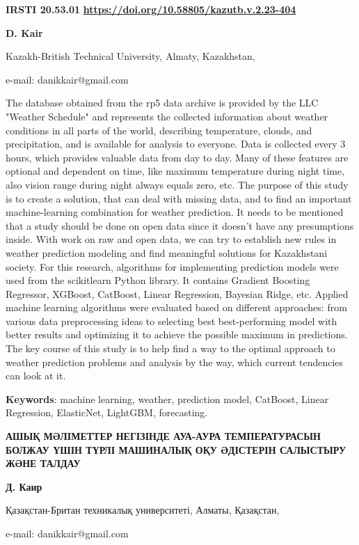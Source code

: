 \newpage
{\bfseries IRSTI 20.53.01}
\hfill {\bfseries \href{https://doi.org/10.58805/kazutb.v.2.23-404}{https://doi.org/10.58805/kazutb.v.2.23-404}}


\begin{center}
{\bfseries D. Kair}

Kazakh-British Technical University, Almaty, Kazakhstan,

e-mail: danikkair@gmail.com
\end{center}

The database obtained from the rp5 data archive is provided by the LLC
"Weather Schedule" and represents the collected information about
weather conditions in all parts of the world, describing temperature,
clouds, and precipitation, and is available for analysis to everyone.
Data is collected every 3 hours, which provides valuable data from day
to day. Many of these features are optional and dependent on time, like
maximum temperature during night time, also vision range during night
always equals zero, etc. The purpose of this study is to create a
solution, that can deal with missing data, and to find an important
machine-learning combination for weather prediction. It needs to be
mentioned that a study should be done on open data since it doesn't have
any presumptions inside. With work on raw and open data, we can try to
establish new rules in weather prediction modeling and find meaningful
solutions for Kazakhstani society. For this research, algorithms for
implementing prediction models were used from the scikitlearn Python
library. It contains Gradient Boosting Regressor, XGBoost, CatBoost,
Linear Regression, Bayesian Ridge, etc. Applied machine learning
algorithms were evaluated based on different approaches: from various
data preprocessing ideas to selecting best best-performing model with
better results and optimizing it to achieve the possible maximum in
predictions. The key course of this study is to help find a way to the
optimal approach to weather prediction problems and analysis by the way,
which current tendencies can look at it.

{\bfseries Keywords}: machine learning, weather, prediction model,
CatBoost, Linear Regression, ElasticNet, LightGBM, forecasting.

\begin{center}
{\large\bfseries АШЫҚ МӘЛІМЕТТЕР НЕГІЗІНДЕ АУА-АУРА ТЕМПЕРАТУРАСЫН БОЛЖАУ ҮШІН
ТҮРЛІ МАШИНАЛЫҚ ОҚУ ӘДІСТЕРІН САЛЫСТЫРУ ЖӘНЕ ТАЛДАУ}

{\bfseries Д. Каир}

Қазақстан-Британ техникалық университеті, Алматы, Қазақстан,

e-mail: danikkair@gmail.com
\end{center}

